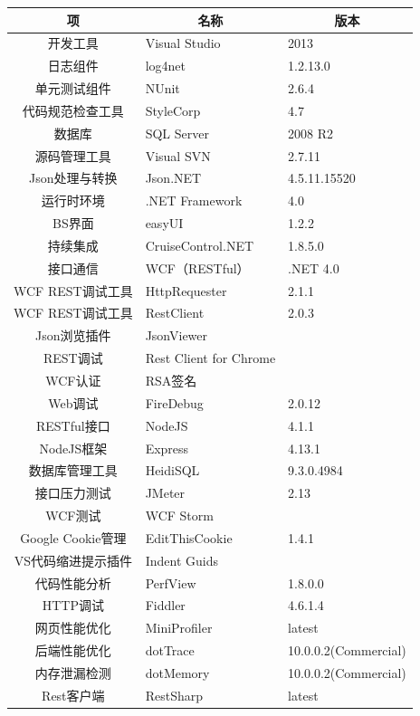 \documentclass{book}
\begin{document}
\begin{tabular}{c|l|l}
	\multirow{1}{*}{项}			
	& \multicolumn{1}{c}{名称}
	& \multicolumn{1}{|c}{版本}\\
	\hline
	开发工具 & Visual Studio & 2013\\
	日志组件 & log4net & 1.2.13.0\\	
	单元测试组件 & NUnit & 2.6.4\\
	代码规范检查工具 & StyleCorp & 4.7\\	
	数据库 & SQL Server & 2008 R2\\
	源码管理工具 & Visual SVN & 2.7.11\\
	Json处理与转换 & Json.NET & 4.5.11.15520\\
	运行时环境 & .NET Framework & 4.0\\
	BS界面 & easyUI & 1.2.2\\
	持续集成 & CruiseControl.NET & 1.8.5.0\\
	接口通信 & WCF（RESTful） & .NET 4.0\\
	WCF REST调试工具 & HttpRequester & 2.1.1 \\
	WCF REST调试工具 & RestClient & 2.0.3 \\
	Json浏览插件 & JsonViewer & \\
	REST调试 & Rest Client for Chrome & \\
	WCF认证 & RSA签名 & \\
	Web调试 & FireDebug & 2.0.12\\
	RESTful接口 & NodeJS & 4.1.1\\
	NodeJS框架 & Express & 4.13.1\\
	数据库管理工具 & HeidiSQL & 9.3.0.4984\\
	接口压力测试 & JMeter & 2.13\\
	WCF测试 & WCF Storm & \\
	Google Cookie管理 & EditThisCookie & 1.4.1 \\
	VS代码缩进提示插件 & Indent Guids & \\
	代码性能分析 & PerfView & 1.8.0.0  \\ 
	HTTP调试 &  Fiddler & 4.6.1.4\\		
    网页性能优化 & MiniProfiler & latest\\
    后端性能优化 & dotTrace & 10.0.0.2(Commercial)\\
    内存泄漏检测 & dotMemory & 10.0.0.2(Commercial)\\
    Rest客户端 & RestSharp & latest\\		
    \end{tabular}
\end{document}
